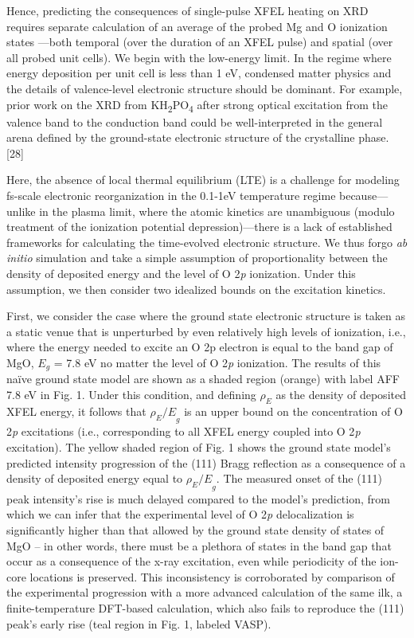 Hence, predicting the consequences of single-pulse XFEL heating on XRD
requires separate calculation of an average of the probed Mg and O
ionization states ---both temporal (over the duration of an XFEL pulse)
and spatial (over all probed unit cells). We begin with the low-energy
limit. In the regime where energy deposition per unit cell is less than
1 eV, condensed matter physics and the details of valence-level
electronic structure should be dominant. For example, prior work on the
XRD from KH\textsubscript{2}PO\textsubscript{4} after strong optical
excitation from the valence band to the conduction band could be
well-interpreted in the general arena defined by the ground-state
electronic structure of the crystalline phase. {[}28{]}

Here, the absence of local thermal equilibrium (LTE) is a challenge for
modeling fs-scale electronic reorganization in the 0.1-1eV temperature
regime because---unlike in the plasma limit, where the atomic kinetics
are unambiguous (modulo treatment of the ionization potential
depression)---there is a lack of established frameworks for calculating
the time-evolved electronic structure. We thus forgo \emph{ab initio}
simulation and take a simple assumption of proportionality between the
density of deposited energy and the level of O 2\emph{p} ionization.
Under this assumption, we then consider two idealized bounds on the
excitation kinetics.

First, we consider the case where the ground state electronic structure
is taken as a static venue that is unperturbed by even relatively high
levels of ionization, i.e., where the energy needed to excite an O 2p
electron is equal to the band gap of MgO, \(E_{g}\) = 7.8 eV no matter
the level of O 2\emph{p} ionization. The results of this naïve ground
state model are shown as a shaded region (orange) with label AFF 7.8 eV
in Fig. 1. Under this condition, and defining \(\rho_{E}\) as the
density of deposited XFEL energy, it follows that \({\rho_{E}/E}_{g}\)
is an upper bound on the concentration of O 2\emph{p} excitations (i.e.,
corresponding to all XFEL energy coupled into O 2\emph{p} excitation).
The yellow shaded region of Fig. 1 shows the ground state model's
predicted intensity progression of the (111) Bragg reflection as a
consequence of a density of deposited energy equal to
\({\rho_{E}/E}_{g}.\) The measured onset of the (111) peak intensity's
rise is much delayed compared to the model's prediction, from which we
can infer that the experimental level of O 2\emph{p} delocalization is
significantly higher than that allowed by the ground state density of
states of MgO -- in other words, there must be a plethora of states in
the band gap that occur as a consequence of the x-ray excitation, even
while periodicity of the ion-core locations is preserved. This
inconsistency is corroborated by comparison of the experimental
progression with a more advanced calculation of the same ilk, a
finite-temperature DFT-based calculation, which also fails to reproduce
the (111) peak's early rise (teal region in Fig. 1, labeled VASP).

